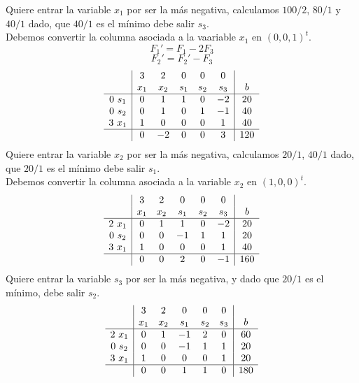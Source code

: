 \documentclass[11pt,fleqn]{book} %
\begin{document}
Quiere entrar la variable $x_1$ por ser la más negativa, calculamos $100/2$, $80/1$ y $40/1$ dado, que $40/1$ es el mínimo debe salir $s_3$. \\
Debemos convertir la columna asociada a la vaariable $x_1$ en $(0, 0, 1)^t$.
$$F_1'=F_1-2F_3$$
$$F_2'=F_2'-F_3$$
$$
\begin{array}{c|ccccc|c}
  & 3 & 2 & 0 & 0 & 0 & \\
  & x_1 & x_2 & s_1 & s_2 & s_3 & b \\ \hline
  0 ~s_1 & 0 & 1 & 1 & 0 &-2 & 20 \\
  0~ s_2 & 0 & 1 & 0 & 1 & -1 & 40 \\
  3 ~x_1 & 1 & 0 & 0 & 0 & 1 & 40 \\ \hline 
  & 0 & -2 & 0 & 0 & 3 & 120
\end{array}
$$
Quiere entrar la variable $x_2$ por ser la más negativa, calculamos $20/1$, $40/1$ dado, que $20/1$ es el mínimo debe salir $s_1$. \\
Debemos convertir la columna asociada a la variable $x_2$ en $(1, 0, 0)^t$.
$$
\begin{array}{c|ccccc|c}
  & 3 & 2 & 0 & 0 & 0 & \\
  & x_1 & x_2 & s_1 & s_2 & s_3 & b \\ \hline
  2 ~x_1 & 0 & 1 & 1 & 0 &-2 & 20 \\
  0~ s_2 & 0 & 0 & -1 & 1 & 1 & 20 \\
  3 ~x_1 & 1 & 0 & 0 & 0 & 1 & 40 \\ \hline 
  & 0 & 0 & 2 & 0 & -1 & 160
\end{array}
$$
Quiere entrar la variable $s_3$ por ser la más negativa,  y dado que $20/1$ es el mínimo, debe salir $s_2$.
$$
\begin{array}{c|ccccc|c}
  & 3 & 2 & 0 & 0 & 0 & \\
  & x_1 & x_2 & s_1 & s_2 & s_3 & b \\ \hline
  2 ~x_1 & 0 & 1 & -1 & 2 & 0 & 60 \\
  0~ s_2 & 0 & 0 & -1 & 1 & 1 & 20 \\
  3 ~x_1 & 1 & 0 & 0 & 0 & 1 & 20 \\ \hline 
  & 0 & 0 & 1 & 1 & 0 & 180
\end{array}
$$
\end{document}
